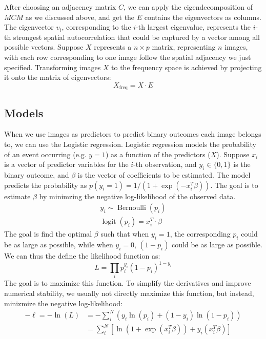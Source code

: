 \documentclass[12pt]{article}
\begin{document}
After choosing an adjacency matrix \( C \), we can apply the eigendecomposition of \( M C M \) as we discussed above, and get the \( E \) contains the eigenvectors as columns. The eigenvector \( v_i \), corresponding to the \( i \)-th largest eigenvalue, represents the \( i \)-th strongest spatial autocorrelation that could be captured by a vector among all possible vectors. Suppose \( X \) represents a \( n \times p \) matrix, representing \( n \) images, with each row corresponding to one image follow the spatial adjacency we just specified. Transforming images \( X \) to the frequency space is achieved by projecting it onto the matrix of eigenvectors:
\[
  X_{\text{freq}} = X \cdot E
\]

\subsection{Models}

When we use images as predictors to predict binary outcomes each image belongs to, we can use the Logistic regression. Logistic regression models the probability of an event occurring (e.g. \( y = 1 \)) as a function of the predictors (\( X \)). Suppose \( x_i \) is a vector of predictor variables for the \( i \)-th observation, and \( y_i \in \{0, 1\} \) is the binary outcome, and \( \beta \) is the vector of coefficients to be estimated. The model predicts the probability as \( p(y_i = 1) = 1 / (1 + \exp(-x_i^T \beta)) \). The goal is to estimate \( \beta \) by minimzing the negative log-likelihood of the observed data.
\[
  \begin{gathered}
    y_i \sim \operatorname{Bernoulli} (p_i) \\
    \operatorname{logit} (p_i) = x_i^T \cdot \beta
  \end{gathered}
\]
The goal is find the optimal \( \beta \) such that when \( y_i = 1 \), the corresponding \( p_i \) could be as large as possible, while when \( y_i = 0 \), \( (1 - p_i) \) could be as large as possible. We can thus the define the likelihood function as:
\[
  L = \prod_i p_i^{y_i} (1 - p_i)^{1 - y_i}
\]
The goal is to maximize this function. To simplify the derivatives and improve numerical stability, we usually not directly maximize this function, but instead, minizmize the negative log-likelihood:
\[
  \begin{aligned}
    - \ell = - \ln(L) & =  - \sum_i^N (y_i \ln(p_i) + (1 - y_i) \ln(1 - p_i) ) \\
                      & = \sum_i^N \left[ \ln \left(1 + \exp(x_i^T \beta) \right) + y_i (x_i^T \beta) \right]
  \end{aligned}
\]
\end{document}

